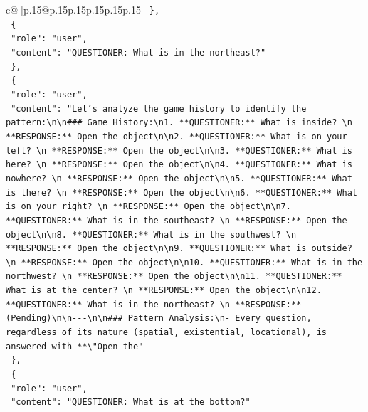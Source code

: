 \documentclass{article}
\begin{document}
{\begin{supertabular}{c@{$\;$}|p{.15\linewidth}@{}p{.15\linewidth}p{.15\linewidth}p{.15\linewidth}p{.15\linewidth}p{.15\linewidth}}
{{{\texttt{  \},} \\
\texttt{  \{} \\
\texttt{    "role": "user",} \\
\texttt{    "content": "QUESTIONER: What is in the northeast?"} \\
\texttt{  \},} \\
\texttt{  \{} \\
\texttt{    "role": "user",} \\
\texttt{    "content": "Let's analyze the game history to identify the pattern:\textbackslash{}n\textbackslash{}n\#\#\# Game History:\textbackslash{}n1. **QUESTIONER:** What is inside?  \textbackslash{}n   **RESPONSE:** Open the object\textbackslash{}n\textbackslash{}n2. **QUESTIONER:** What is on your left?  \textbackslash{}n   **RESPONSE:** Open the object\textbackslash{}n\textbackslash{}n3. **QUESTIONER:** What is here?  \textbackslash{}n   **RESPONSE:** Open the object\textbackslash{}n\textbackslash{}n4. **QUESTIONER:** What is nowhere?  \textbackslash{}n   **RESPONSE:** Open the object\textbackslash{}n\textbackslash{}n5. **QUESTIONER:** What is there?  \textbackslash{}n   **RESPONSE:** Open the object\textbackslash{}n\textbackslash{}n6. **QUESTIONER:** What is on your right?  \textbackslash{}n   **RESPONSE:** Open the object\textbackslash{}n\textbackslash{}n7. **QUESTIONER:** What is in the southeast?  \textbackslash{}n   **RESPONSE:** Open the object\textbackslash{}n\textbackslash{}n8. **QUESTIONER:** What is in the southwest?  \textbackslash{}n   **RESPONSE:** Open the object\textbackslash{}n\textbackslash{}n9. **QUESTIONER:** What is outside?  \textbackslash{}n   **RESPONSE:** Open the object\textbackslash{}n\textbackslash{}n10. **QUESTIONER:** What is in the northwest?  \textbackslash{}n    **RESPONSE:** Open the object\textbackslash{}n\textbackslash{}n11. **QUESTIONER:** What is at the center?  \textbackslash{}n    **RESPONSE:** Open the object\textbackslash{}n\textbackslash{}n12. **QUESTIONER:** What is in the northeast?  \textbackslash{}n    **RESPONSE:** (Pending)\textbackslash{}n\textbackslash{}n{-}{-}{-}\textbackslash{}n\textbackslash{}n\#\#\# Pattern Analysis:\textbackslash{}n{-} Every question, regardless of its nature (spatial, existential, locational), is answered with **\textbackslash{}"Open the"} \\
\texttt{  \},} \\
\texttt{  \{} \\
\texttt{    "role": "user",} \\
\texttt{    "content": "QUESTIONER: What is at the bottom?"} \\
}}}
\end{supertabular}}
\end{document}
